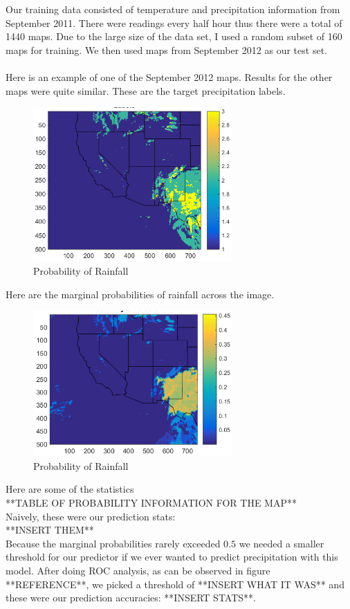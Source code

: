 Our training data consisted of temperature and precipitation information from September 2011. There were readings every half hour thus there were a total of 1440 maps. Due to the large size of the data set, I used a random subset of 160 maps for training. We then used maps from September 2012 as our test set. \\
\\
Here is an example of one of the September 2012 maps. Results for the other maps were quite similar. These are the target precipitation labels. 
\begin{figure}[h]
\centering
\includegraphics[width=3in]{./zackWriteUp/time1196_labelMap.png}
\caption{Probability of Rainfall}
\end{figure}
Here are the marginal probabilities of rainfall across the image.
\begin{figure}[h]
\centering
\includegraphics[width=3in]{./zackWriteUp/time1196_probPrecip.png}
\caption{Probability of Rainfall}
\end{figure}
Here are some of the statistics \\
**TABLE OF PROBABILITY INFORMATION FOR THE MAP**\\
Naively, these were our prediction stats:\\
**INSERT THEM**\\
Because the marginal probabilities rarely exceeded $0.5$ we needed a smaller threshold for our predictor if we ever wanted to predict precipitation with this model. After doing ROC analysis, as can be observed in figure **REFERENCE**, we picked a threshold of **INSERT WHAT IT WAS** and these were our prediction accuracies: **INSERT STATS**. 



